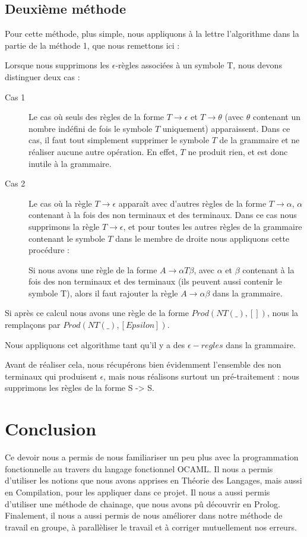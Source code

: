 \documentclass[11pt,a4paper]{article}
\begin{document}
\subsection{Deuxième méthode}

Pour cette méthode, plus simple, nous appliquons à la lettre l'algorithme dans la partie de la
méthode 1, que nous remettons ici : 

Lorsque nous supprimons les $\epsilon$-règles associées à un 
symbole T, nous devons distinguer deux cas : 
\begin{description}
    \item[Cas 1] Le cas où seuls des règles de la forme
        $T \rightarrow \epsilon$ et $T \rightarrow \theta$
        (avec $\theta$ contenant un nombre indéfini de
        fois le symbole $T$ uniquement) apparaissent. Dans ce cas, il faut 
        tout simplement supprimer le symbole $T$ de la grammaire et ne réaliser
        aucune autre opération. En effet, $T$ ne produit rien, et est
        donc inutile à la grammaire.
    \item[Cas 2] Le cas où la règle $T \rightarrow \epsilon$ apparaît avec d'autres
        règles de la forme $T \rightarrow \alpha$, $\alpha$ contenant
        à la fois des non terminaux et des terminaux. Dans ce cas nous supprimons
        la règle $T \rightarrow \epsilon$, et pour toutes les autres règles de la grammaire
        contenant le symbole $T$ dans le membre de droite nous appliquons cette
        procédure : 
        
        Si nous avons une règle de la forme $A \rightarrow \alpha T \beta$,
        avec $\alpha$ et $\beta$ contenant à la fois des non terminaux et des terminaux
        (ils peuvent aussi contenir  le symbole T), alors il faut rajouter la règle
        $A \rightarrow \alpha \beta$ dans la grammaire.
\end{description}

Si après ce calcul nous avons une règle de la forme $Prod(NT(\_), [])$, nous la remplaçons
par $Prod(NT(\_), [Epsilon])$.

Nous appliquons cet algorithme tant qu'il y a des $\epsilon-regles$ dans la grammaire.

Avant de réaliser cela, nous récupérons bien évidemment l'ensemble des non terminaux 
qui produisent $\epsilon$, mais nous réalisons surtout un pré-traitement : nous
supprimons les règles de la forme S -> S.

\newpage

\section{Conclusion}
Ce devoir nous a permis de nous familiariser un peu plus avec la
programmation fonctionnelle au travers du langage fonctionnel OCAML. Il nous a permis d'utiliser les notions que nous avons apprises en Théorie des Langages, mais aussi en Compilation, pour les appliquer
dans ce projet. Il nous a aussi permis d'utiliser une méthode de chainage, que nous avons pû découvrir en Prolog. Finalement, il nous a aussi permis de nous améliorer dans notre méthode de travail en groupe, à parallèliser le travail et à corriger mutuellement nos erreurs.
\end{document}

